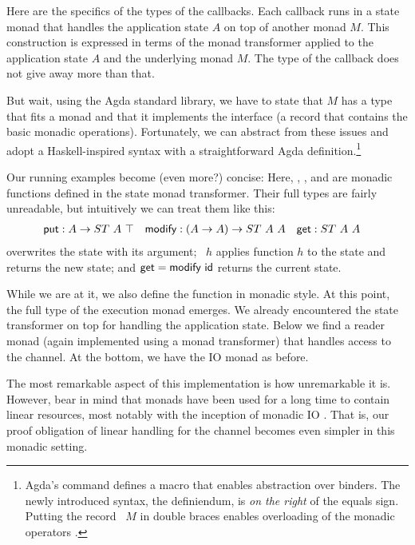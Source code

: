 \documentclass[acmsmall,screen,anonymous,review]{acmart}
\begin{document}
\mstCommand

Here are the specifics of the types of the callbacks. Each callback
runs in a state monad that handles the application state $A$ on top of
another monad $M$. This construction is expressed in terms of the
monad transformer {\AStateT} applied to the application state
$A$ and the underlying monad $M$. The type of the callback does not give away more
than that.

But wait, using the Agda standard library, we have to state that $M$
has a type that fits a monad and that it implements the
interface {\ARawMonad} (a record that contains the basic monadic
operations).
Fortunately, we can abstract from these issues and adopt a
Haskell-inspired syntax with a straightforward
Agda definition.\footnote{Agda's  command defines
  a macro that enables abstraction over binders. The newly introduced
  syntax, the definiendum, is \emph{on the right} of the equals
  sign. Putting the record {\ARawMonad~$M$} in double braces enables overloading of the
  monadic operators \cite{DBLP:conf/icfp/DevrieseP11}.}
\mstMonadic

Our running examples become (even more?) concise:
\mstExampleServers
Here, {\Aput}, {\Amodify}, and {\Aget} are monadic functions defined
in the state monad transformer. Their full types are fairly
unreadable, but intuitively we can treat them like this:
\begin{align*}
  \Aput &: A \to ST~A~\top
  & \Amodify &: (A \to A)\to ST~A~A
  & \Aget &: ST~A~A
\end{align*}
{\Aput} overwrites the state with its argument; {\Amodify~$h$} applies 
function $h$ to the state and returns the new state; and {$\Aget = \Amodify~\Aid$} returns the current state.

While we are at it, we also define the {\Aexecutor} function in
monadic style. At this point, the full type of the execution monad
emerges. We already encountered the state transformer on top for
handling the application state. Below we find a reader monad (again
implemented using a monad transformer) that handles access to the
channel. At the bottom, we have the IO monad as before.
\mstExecutor

The most remarkable aspect of this implementation is how unremarkable
it is. However, bear in mind that monads have been used for a long
time to contain linear resources, most notably with the inception of
monadic IO \cite{DBLP:conf/popl/JonesW93}. That is, our proof
obligation of linear handling for the channel becomes even simpler in
this monadic setting.
\end{document}
